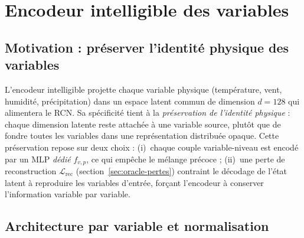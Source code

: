 \documentclass[14pt,a4paper,openany]{extreport}
\theoremstyle{definition}
\newcommand{\Lrec}{\ensuremath{\mathcal{L}_{\mathrm{rec}}}}
\begin{document}
\section{Encodeur intelligible des variables}
\label{sec:oracle-encoder}

\subsection{Motivation : préserver l'identité physique des variables}
\label{ssec:oracle-encoder-motivation}

L'encodeur intelligible projette chaque variable physique (température, vent, humidité, précipitation) dans un espace latent commun de dimension $d=128$ qui alimentera le RCN. Sa spécificité tient à la \emph{préservation de l'identité physique} : chaque dimension latente reste attachée à une variable source, plutôt que de fondre toutes les variables dans une représentation distribuée opaque. Cette préservation repose sur deux choix : (i)~chaque couple variable-niveau est encodé par un MLP \emph{dédié} $f_{v,p}$, ce qui empêche le mélange précoce ; (ii)~une perte de reconstruction $\Lrec$ (section~\ref{sec:oracle-pertes}) contraint le décodage de l'état latent à reproduire les variables d'entrée, forçant l'encodeur à conserver l'information variable par variable.

\subsection{Architecture par variable et normalisation}
\label{ssec:oracle-encoder-archi}
\end{document}

